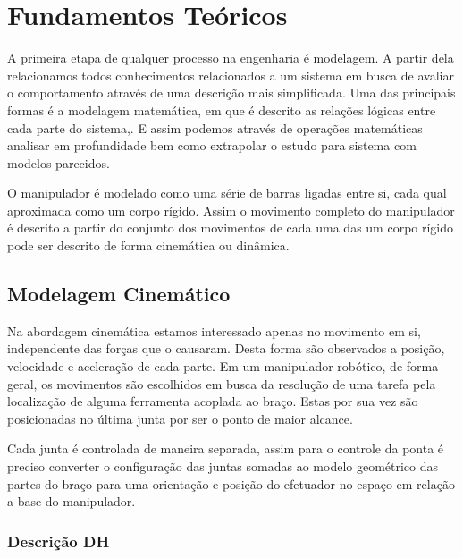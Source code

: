 \chapter{Fundamentos Teóricos}


\label{CapIntroTeory}


A primeira etapa de qualquer processo na engenharia é modelagem. A partir dela relacionamos todos conhecimentos relacionados a um sistema em busca de avaliar o comportamento através de uma descrição mais simplificada. Uma das principais formas é a modelagem matemática, em que é descrito as relações lógicas entre cada parte do sistema,. E assim podemos através de operações matemáticas analisar em profundidade bem como extrapolar o estudo para sistema com modelos parecidos.

O manipulador é modelado como uma série de barras ligadas entre si, cada qual aproximada como um corpo rígido. Assim o movimento completo do manipulador é descrito a partir do conjunto dos movimentos de cada uma das  um corpo rígido pode ser descrito de forma cinemática ou dinâmica. 


\section{Modelagem Cinemático}

Na abordagem cinemática estamos interessado apenas no movimento em si, independente das forças que o causaram. Desta forma são observados a posição, velocidade e aceleração de cada parte. Em um manipulador robótico, de forma geral, os movimentos são escolhidos em busca da resolução de uma tarefa pela localização de alguma ferramenta acoplada ao braço. Estas por sua vez são posicionadas no última junta por ser o ponto de maior alcance.


Cada junta é controlada de maneira separada, assim para o controle da ponta é preciso converter o configuração das juntas somadas ao modelo geométrico das partes do braço para uma orientação e posição do efetuador no espaço em relação a base do manipulador.



\subsection{Descrição DH}

